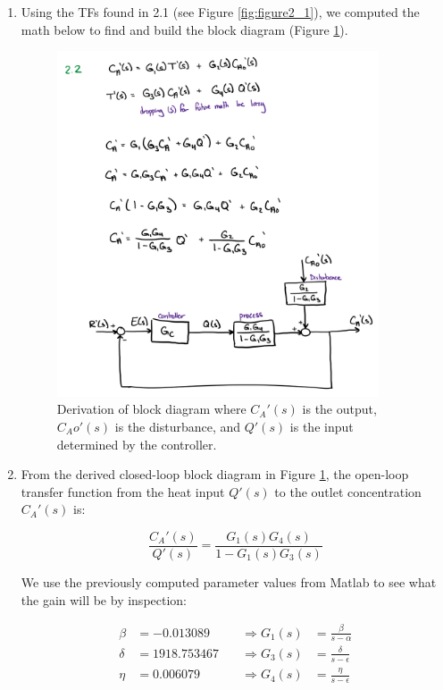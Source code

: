 \documentclass[12pt]{article}
\begin{document}
\begin{enumerate}
\begin{enumerate}
    \clearpage
    \item Using the TFs found in 2.1 (see Figure \ref{fig:figure2_1}), we computed the math below to find and build the block diagram (Figure \ref{fig:figure2_2}).
    
    \begin{figure}[H]
      \centering
      \includegraphics[width=0.9\textwidth]{Figures/figure2_2.png}
      \caption{Derivation of block diagram where \( C_A'(s) \) is the output, \( C_Ao'(s) \) is the disturbance, and \( Q'(s) \) is the input determined by the controller.}
      \label{fig:figure2_2}
    \end{figure}

    \clearpage
    \item From the derived closed-loop block diagram in Figure \ref{fig:figure2_2}, the open-loop transfer function from the heat input \(Q'(s)\) to the outlet concentration \(C_A'(s)\) is:

    \[
    \frac{C_A'(s)}{Q'(s)} = \frac{G_1(s) G_4(s)}{1 - G_1(s) G_3(s)}
    \]
    
    We use the previously computed parameter values from Matlab to see what the gain will be by inspection:
    
    \[
    \begin{aligned}
    \beta &= -0.013089 \quad &\Rightarrow G_1(s) &= \frac{\beta}{s - \alpha} \\
    \delta &= 1918.753467 \quad &\Rightarrow G_3(s) &= \frac{\delta}{s - \epsilon} \\
    \eta &= 0.006079 \quad &\Rightarrow G_4(s) &= \frac{\eta}{s - \epsilon}
    \end{aligned}
    \]
    

\end{enumerate}
\end{enumerate}
\end{document}
